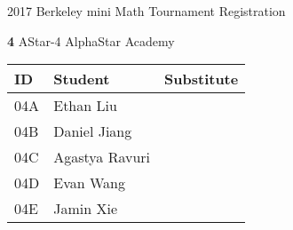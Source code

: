 \documentclass[12pt]{amsart}
\begin{document}
\newpage



\renewcommand{\TeamID}{4}
\renewcommand{\TeamName}{AStar-4}
\renewcommand{\SchoolName}{AlphaStar Academy}
\renewcommand{\IDA}{04A}
\renewcommand{\IDB}{04B}
\renewcommand{\IDC}{04C}
\renewcommand{\IDD}{04D}
\renewcommand{\IDE}{04E}
\renewcommand{\StudentA}{Ethan Liu}
\renewcommand{\StudentB}{Daniel Jiang}
\renewcommand{\StudentC}{Agastya Ravuri}
\renewcommand{\StudentD}{Evan Wang}
\renewcommand{\StudentE}{Jamin Xie}

\begin{center}
{\sc \Large 2017 Berkeley mini Math Tournament Registration}

\bigskip
\bigskip

{\bf \Large  \TeamID} \hfill {\large \TeamName} \hfill {\large \SchoolName}

\bigskip
\bigskip

\begin{tabular}{| p{} | p{} | p{} |}
\hline
\bf ID         & \bf Student             & \bf Substitute             \\ \hline
\IDA           & \StudentA               &                            \\ \hline
\IDB           & \StudentB               &                            \\ \hline
\IDC           & \StudentC               &                            \\ \hline
\IDD           & \StudentD               &                            \\ \hline
\IDE           & \StudentE               &                            \\ \hline
\end{tabular} 
\end{center}
\bigskip
\bigskip

\newpage



\renewcommand{\TeamID}{5}
\renewcommand{\TeamName}{AStar-5}
\renewcommand{\SchoolName}{AlphaStar Academy}
\renewcommand{\IDA}{05A}
\renewcommand{\IDB}{05B}
\renewcommand{\IDC}{05C}
\renewcommand{\IDD}{05D}
\renewcommand{\IDE}{05E}
\renewcommand{\StudentA}{Alex Dong}
\renewcommand{\StudentB}{Aniketh Tummala}
\renewcommand{\StudentC}{Sohil Rathi}
\renewcommand{\StudentD}{Kyle Lei}
\renewcommand{\StudentE}{Vincent Lo}
\end{document}
